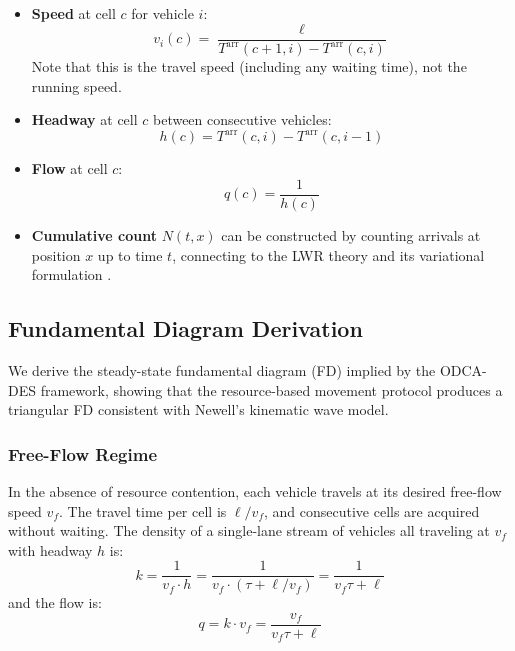 \documentclass[review,authoryear]{elsarticle}
\newcommand{\Tarr}{T^{\text{arr}}}
\begin{document}
\begin{itemize}
    \item \textbf{Speed} at cell $c$ for vehicle $i$:
    \begin{equation}
        v_i(c) = \frac{\ell}{\Tarr(c+1, i) - \Tarr(c, i)}
        \label{eq:speed_from_T}
    \end{equation}
    Note that this is the travel speed (including any waiting time), not the running speed.

    \item \textbf{Headway} at cell $c$ between consecutive vehicles:
    \begin{equation}
        h(c) = \Tarr(c, i) - \Tarr(c, i-1)
        \label{eq:headway_from_T}
    \end{equation}

    \item \textbf{Flow} at cell $c$:
    \begin{equation}
        q(c) = \frac{1}{h(c)}
        \label{eq:flow_from_T}
    \end{equation}

    \item \textbf{Cumulative count} $N(t, x)$ can be constructed by counting arrivals at position $x$ up to time $t$, connecting to the LWR theory \citep{lighthill1955kinematic, richards1956shock} and its variational formulation \citep{daganzo2005variational}.
\end{itemize}

\subsection{Fundamental Diagram Derivation}
\label{sec:fd_derivation}

We derive the steady-state fundamental diagram (FD) implied by the ODCA-DES framework, showing that the resource-based movement protocol produces a triangular FD consistent with Newell's kinematic wave model.

\subsubsection{Free-Flow Regime}

In the absence of resource contention, each vehicle travels at its desired free-flow speed $v_f$. The travel time per cell is $\ell / v_f$, and consecutive cells are acquired without waiting. The density of a single-lane stream of vehicles all traveling at $v_f$ with headway $h$ is:
\begin{equation}
    k = \frac{1}{v_f \cdot h} = \frac{1}{v_f \cdot (\tau + \ell / v_f)} = \frac{1}{v_f \tau + \ell}
    \label{eq:density_freeflow}
\end{equation}
and the flow is:
\begin{equation}
    q = k \cdot v_f = \frac{v_f}{v_f \tau + \ell}
    \label{eq:flow_freeflow}
\end{equation}
\end{document}

